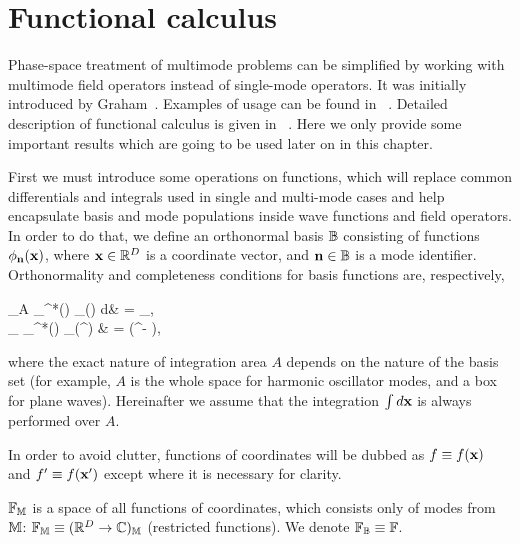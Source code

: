 \chapter{Functional calculus}
\label{cha:appendix:func-calculus}

Phase-space treatment of multimode problems can be simplified by working with multimode field operators instead of single-mode operators.
It was initially introduced by Graham~\cite{Graham1970,Graham1970a}.
Examples of usage can be found in ~\cite{Steel1998,Norrie2006a}.
Detailed description of functional calculus is given in~\cite{Dalton2011} .
Here we only provide some important results which are going to be used later on in this chapter.

First we must introduce some operations on functions, which will replace common differentials and integrals used in single and multi-mode cases and help encapsulate basis and mode populations inside wave functions and field operators.
In order to do that, we define an orthonormal basis $\mathbb{B}$ consisting of functions $\phi_{\mathbf{n}}(\mathbf{x})$, where $\mathbf{x} \in \mathbb{R}^D$ is a coordinate vector, and $\mathbf{n} \in \mathbb{B}$ is a mode identifier.
Orthonormality and completeness conditions for basis functions are, respectively,
\begin{eqns}
	\int\limits_A \phi_{\nvec}^*(\xvec) \phi_{\mvec}(\xvec) d\xvec & = \delta_{\nvec\mvec}, \\
	\sum_{\nvec} \phi_{\nvec}^*(\xvec) \phi_{\nvec}(\xvec^\prime) & = \delta(\xvec^\prime - \xvec),
\end{eqns}
where the exact nature of integration area $A$ depends on the nature of the basis set
(for example, $A$ is the whole space for harmonic oscillator modes, and a box for plane waves).
Hereinafter we assume that the integration $\int d\mathbf{x}$ is always performed over $A$.

In order to avoid clutter, functions of coordinates will be dubbed as $f \equiv f(\mathbf{x})$ and $f^\prime \equiv f(\mathbf{x}^\prime)$ except where it is necessary for clarity.

\begin{definition}
	$\mathbb{F}_{\mathbb{M}}$ is a space of all functions of coordinates, which consists only of modes from $\mathbb{M}$: $\mathbb{F}_{\mathbb{M}} \equiv (\mathbb{R}^D \rightarrow \mathbb{C})_{\mathbb{M}}$ (restricted functions).
	We denote $\mathbb{F}_{\mathbb{B}} \equiv \mathbb{F}$.
\end{definition}

